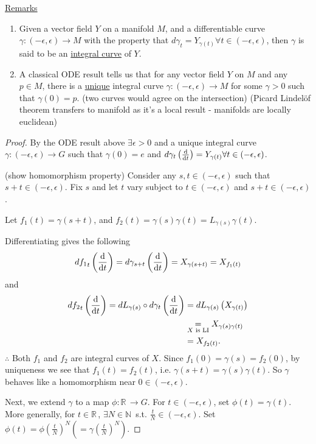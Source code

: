 \documentclass[12pt,a4paper]{article}
\newcommand{\nN}{\ensuremath{\mathbb{N}\,}}
\newcommand{\rR}{\ensuremath{\mathbb{R}\,}}
\newcommand{\dgq}[2]{\ensuremath{d {#1}_{#2}}}
\newcommand{\ul}[1]{\underline{#1}}
\begin{document}
\ul{Remarks}
\begin{enumerate}
\item Given a vector field $Y$ on a manifold $M$, and a differentiable curve $\gamma:(-\epsilon,\epsilon)\to M$ with the property that $\dgq{\gamma}{t}=Y_{\gamma(t)} \forall t\in (-\epsilon,\epsilon)$, then $\gamma$ is said to be an \ul{integral curve} of $Y$.
\item A classical ODE result tells us that for any vector field $Y$ on $M$ and any $p\in M$, there is a \ul{unique} integral curve $\gamma:(-\epsilon,\epsilon)\to M$ for some $\gamma>0$ such that $\gamma(0)=p$. (two curves would agree on the intersection) (Picard Lindel\"of theorem transfers to manifold as it's a local result - manifolds are locally euclidean)
 \end{enumerate}
\begin{proof}
By the ODE result above $\exists \epsilon>0$ and a unique integral curve $\gamma:(-\epsilon,\epsilon)\to G$ such that $\gamma(0)=e$ and $\dgq{\gamma}{t}\left(\dv{t}\right)=Y_{\gamma(t)} \forall t \in (-\epsilon,\epsilon)$.

(show homomorphism property) 
Consider any $s,t \in (-\epsilon,\epsilon)$ such that $s+t\in (-\epsilon,\epsilon)$. Fix $s$ and let $t$ vary subject to $t\in (-\epsilon,\epsilon)$ and $s+t \in (-\epsilon,\epsilon)$.

Let $f_1(t)=\gamma(s+t)$, and $f_2(t)=\gamma(s)\gamma(t)=L_{\gamma(s)}\gamma(t)$.

Differentiating gives the following 
\[\dgq{f_1}{t}\left(\dv{t}\right)=\dgq{\gamma}{s+t}\left(\dv{t}\right)=X_{\gamma(s+t)}=X_{f_1(t)}\]
and
\begin{align*}
\dgq{f_2}{t}\left(\dv{t}\right)=\dgq{L}{\gamma(s)}\circ\dgq{\gamma}{t}\left(\dv{t}\right)&=\dgq{L}{\gamma(s)}\left(X_{\gamma(t)}\right)\\
&\underset{X\text{ is LI}}{=}X_{\gamma(s)\gamma(t)}\\
&= X_{f_2(t)}.
\end{align*}
$\therefore$ Both $f_1$ and $f_2$ are integral curves of $X$. Since $f_1(0)=\gamma(s)=f_2(0)$, by uniqueness we see that $f_1(t)=f_2(t)$, i.e. $\gamma(s+t)=\gamma(s)\gamma(t)$. So $\gamma$ behaves like a homomorphism near $0\in (-\epsilon,\epsilon)$.

Next, we extend $\gamma$ to a map $\phi:\rR \to G$. For $t\in (-\epsilon,\epsilon)$, set $\phi(t)=\gamma(t)$. More generally, for $t\in \rR$, $\exists N\in \nN$ s.t. $\frac{t}{N}\in (-\epsilon,\epsilon)$. Set $\phi(t)=\phi\left(\frac{t}{N}\right)^N (=\gamma\left(\frac{t}{N}\right)^N)$.


\end{proof}
\end{document}
